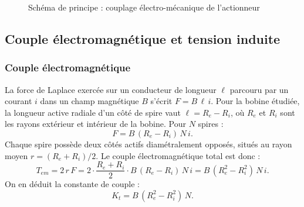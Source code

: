 \begin{figure}[H]
\centering
{}
\caption{Schéma de principe : couplage électro-mécanique de l'actionneur}
\label{fig:schema_bloc}
\end{figure}

\subsection{Couple électromagnétique et tension induite}

\subsubsection{Couple électromagnétique}

La force de Laplace exercée sur un conducteur de longueur \(\ell\) parcouru par un courant \(i\) dans un champ magnétique \(B\) s'écrit \(F = B\,\ell\,i\). Pour la bobine étudiée, la longueur active radiale d'un côté de spire vaut \(\ell = R_e - R_i\), où \(R_e\) et \(R_i\) sont les rayons extérieur et intérieur de la bobine. Pour \(N\) spires :
\begin{equation}
F = B\,(R_e - R_i)\,N\,i.
\end{equation}
Chaque spire possède deux côtés actifs diamétralement opposés, situés au rayon moyen \(r = (R_e + R_i)/2\). Le couple électromagnétique total est donc :
\begin{equation}
T_{em} = 2\,r\,F = 2\cdot\frac{R_e + R_i}{2}\cdot B\,(R_e - R_i)\,N\,i = B\,(R_e^2 - R_i^2)\,N\,i.
\end{equation}
On en déduit la constante de couple :
\begin{equation}
K_t = B\,(R_e^2 - R_i^2)\,N.
\label{eq:Kt_geom}
\end{equation}

